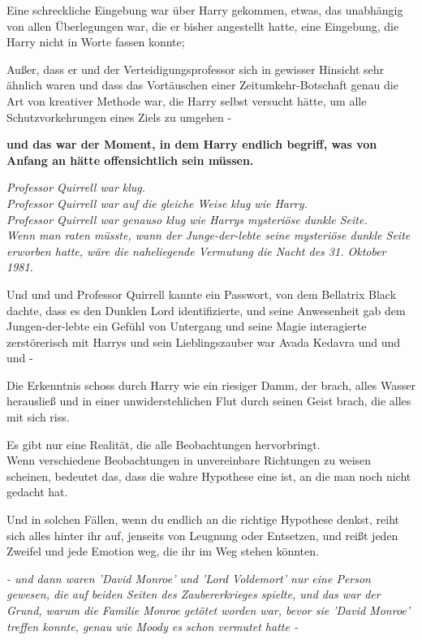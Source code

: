 {Eine schreckliche Eingebung war über Harry gekommen, etwas, das unabhängig von allen Überlegungen war, die er bisher angestellt hatte, eine Eingebung, die Harry nicht in Worte fassen konnte;

Außer, dass er und der Verteidigungsprofessor sich in gewisser Hinsicht sehr ähnlich waren und dass das Vortäuschen einer Zeitumkehr-Botschaft genau die Art von kreativer Methode war, die Harry selbst versucht hätte, um alle Schutzvorkehrungen eines Ziels zu umgehen -

\textbf{und das war der Moment, in dem Harry endlich begriff, was von Anfang an hätte offensichtlich sein müssen.}

\emph{Professor Quirrell war klug.\\ Professor Quirrell war auf die gleiche Weise klug wie Harry.\\ Professor Quirrell war genauso klug wie Harrys mysteriöse dunkle Seite.\\ Wenn man raten müsste, wann der Junge-der-lebte seine mysteriöse dunkle Seite erworben hatte, wäre die naheliegende Vermutung die Nacht des 31. Oktober 1981.}

Und und und Professor Quirrell kannte ein Passwort, von dem Bellatrix Black dachte, dass es den Dunklen Lord identifizierte, und seine Anwesenheit gab dem Jungen-der-lebte ein Gefühl von Untergang und seine Magie interagierte zerstörerisch mit Harrys und sein Lieblingszauber war Avada Kedavra und und und -

Die Erkenntnis schoss durch Harry wie ein riesiger Damm, der brach, alles Wasser herausließ und in einer unwiderstehlichen Flut durch seinen Geist brach, die alles mit sich riss.

Es gibt nur eine Realität, die alle Beobachtungen hervorbringt.\\ Wenn verschiedene Beobachtungen in unvereinbare Richtungen zu weisen scheinen, bedeutet das, dass die wahre Hypothese eine ist, an die man noch nicht gedacht hat.

Und in solchen Fällen, wenn du endlich an die richtige Hypothese denkst, reiht sich alles hinter ihr auf, jenseits von Leugnung oder Entsetzen, und reißt jeden Zweifel und jede Emotion weg, die ihr im Weg stehen könnten.

\emph{- und dann waren 'David Monroe' und 'Lord Voldemort' nur eine Person gewesen, die auf beiden Seiten des Zaubererkrieges spielte, und das war der Grund, warum die Familie Monroe getötet worden war, bevor sie 'David Monroe' treffen konnte, genau wie Moody es schon vermutet hatte -}

}
